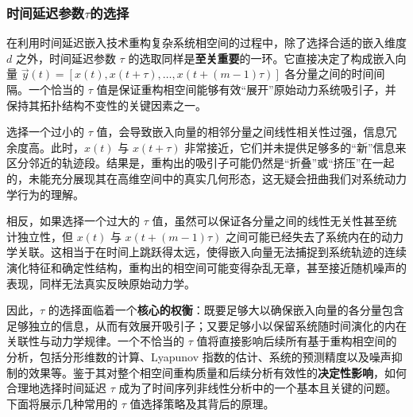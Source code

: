\subsubsection{时间延迟参数$\tau$的选择}


在利用时间延迟嵌入技术重构复杂系统相空间的过程中，除了选择合适的嵌入维度 $d$ 之外，时间延迟参数 $\tau$ 的选取同样是\textbf{至关重要}的一环。它直接决定了构成嵌入向量 $\vec{y}(t) = [x(t), x(t+\tau), \dots, x(t+(m-1)\tau)]$ 各分量之间的时间间隔。一个恰当的 $\tau$ 值是保证重构相空间能够有效“展开”原始动力系统吸引子，并保持其拓扑结构不变性的关键因素之一。

选择一个过小的 $\tau$ 值，会导致嵌入向量的相邻分量之间线性相关性过强，信息冗余度高。此时，$x(t)$ 与 $x(t+\tau)$ 非常接近，它们并未提供足够多的“新”信息来区分邻近的轨迹段。结果是，重构出的吸引子可能仍然是“折叠”或“挤压”在一起的，未能充分展现其在高维空间中的真实几何形态，这无疑会扭曲我们对系统动力学行为的理解。

相反，如果选择一个过大的 $\tau$ 值，虽然可以保证各分量之间的线性无关性甚至统计独立性，但 $x(t)$ 与 $x(t+(m-1)\tau)$ 之间可能已经失去了系统内在的动力学关联。这相当于在时间上跳跃得太远，使得嵌入向量无法捕捉到系统轨迹的连续演化特征和确定性结构，重构出的相空间可能变得杂乱无章，甚至接近随机噪声的表现，同样无法真实反映原始动力学。

因此，$\tau$ 的选择面临着一个\textbf{核心的权衡}：既要足够大以确保嵌入向量的各分量包含足够独立的信息，从而有效展开吸引子；又要足够小以保留系统随时间演化的内在关联性与动力学规律。一个不恰当的 $\tau$ 值将直接影响后续所有基于重构相空间的分析，包括分形维数的计算、Lyapunov 指数的估计、系统的预测精度以及噪声抑制的效果等。鉴于其对整个相空间重构质量和后续分析有效性的\textbf{决定性影响}，如何合理地选择时间延迟 $\tau$ 成为了时间序列非线性分析中的一个基本且关键的问题。下面将展示几种常用的 $\tau$ 值选择策略及其背后的原理。


